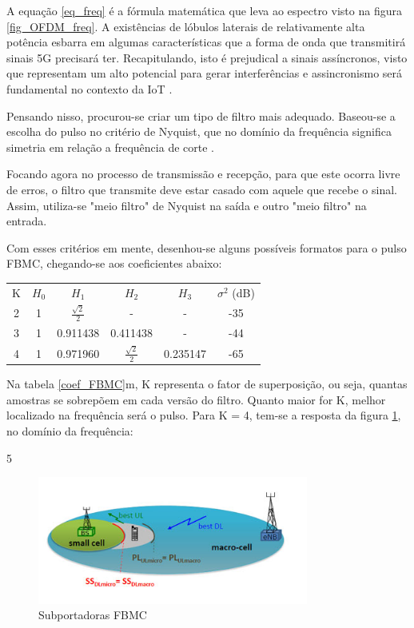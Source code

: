 A equação \ref{eq_freq} é a fórmula matemática que leva ao espectro visto na figura \ref{fig_OFDM_freq}. A existências de lóbulos laterais de relativamente alta potência esbarra em algumas características que a forma de onda que transmitirá sinais 5G precisará ter. Recapitulando, isto é prejudical a sinais assíncronos, visto que representam um alto potencial para gerar interferências e assincronismo será fundamental no contexto da IoT \cite{Wunder}.  
\par Pensando nisso, procurou-se criar um tipo de filtro mais adequado. Baseou-se a escolha do pulso no critério de Nyquist, que no domínio da frequência significa simetria em relação a frequência de corte \cite{Bellanger}. 
\par Focando agora no processo de transmissão e recepção, para que este ocorra livre de erros, o filtro que transmite deve estar casado com aquele que recebe o sinal. Assim, utiliza-se "meio filtro" de Nyquist na saída e outro "meio filtro" na entrada. 
\par Com esses critérios em mente, desenhou-se alguns possíveis formatos para o pulso FBMC, chegando-se aos coeficientes abaixo: 

\begin{center} \label{coef_FBMC}
\begin{tabular}{ c c c c c c  }
 K & $H_{0}$ &  $H_{1}$ & $H_{2}$ & $H_{3}$ & $\sigma^{2}$ (dB) \\ 
 2 & 1 & $\frac{\sqrt{2}}{2}$ & - & - & -35\\  
 3 & 1 & 0.911438 & 0.411438 & - & -44\\
 4 & 1 & 0.971960 & $\frac{\sqrt{2}}{2}$ & 0.235147 & -65
\end{tabular}
\end{center}

Na tabela \ref{coef_FBMC}m, K representa o fator de superposição, ou seja, quantas amostras se sobrepõem em cada versão do filtro. Quanto maior for K, melhor localizado na frequência será o pulso. Para K = 4, tem-se a resposta da figura \ref{fig_FBMC}, no domínio da frequência:

5\begin{figure}[h!]
\centering
\includegraphics[width=3.5in]{comp.png} %
\caption{Subportadoras FBMC}
\label{fig_FBMC}
\end{figure}

